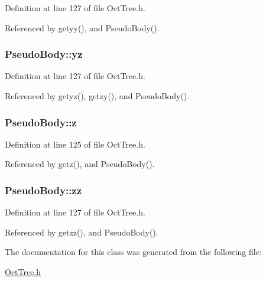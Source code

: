 Definition at line 127 of file OctTree.h.



Referenced by getyy(), and PseudoBody().

\subsubsection[{yz}]{ {\bf PseudoBody::yz}}\label{classPseudoBody_a8ff5cebfd6dbd0ce11474aefe907a7ef}


Definition at line 127 of file OctTree.h.



Referenced by getyz(), getzy(), and PseudoBody().

\subsubsection[{z}]{ {\bf PseudoBody::z}}\label{classPseudoBody_a525516d0ad812376279295230ea3c0cd}


Definition at line 125 of file OctTree.h.



Referenced by getz(), and PseudoBody().

\subsubsection[{zz}]{ {\bf PseudoBody::zz}}\label{classPseudoBody_a780383e80d62974388cee24f7c78ad73}


Definition at line 127 of file OctTree.h.



Referenced by getzz(), and PseudoBody().



The documentation for this class was generated from the following file:\begin{DoxyCompactItemize}
\item 
\hyperlink{OctTree_8h}{OctTree.h}\end{DoxyCompactItemize}
